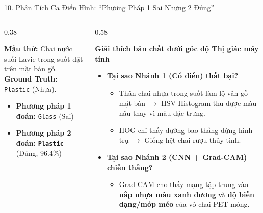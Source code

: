 \documentclass[aspectratio=169, 10pt]{beamer}
\begin{document}
\begin{frame}{10. Phân Tích Ca Điển Hình: ``Phương Pháp 1 Sai Nhưng 2 Đúng''}
\begin{columns}[T]
  \begin{column}{0.38\textwidth}
    \begin{tcolorbox}[colback=white, colframe=AccentRed, title=\textbf{Tình huống thực tế}]
      \textbf{Mẫu thử:} Chai nước suối Lavie trong suốt đặt trên mặt bàn gỗ.\\
      \textbf{Ground Truth:} \texttt{Plastic} (Nhựa).
    \end{tcolorbox}
    \vspace{0.2cm}
    \begin{itemize}
      \item \textbf{Phương pháp 1 đoán:} \alert{\texttt{Glass}} (Sai)
      \item \textbf{Phương pháp 2 đoán:} \textcolor{GreenRecycle}{\textbf{\texttt{Plastic}}} (Đúng, 96.4\%)
    \end{itemize}
  \end{column}

  \begin{column}{0.58\textwidth}
    \begin{block}{\textbf{Giải thích bản chất dưới góc độ Thị giác máy tính}}
      \begin{itemize}
        \item \textbf{Tại sao Nhánh 1 (Cổ điển) thất bại?}
        \begin{itemize}
          \item Thân chai nhựa trong suốt làm lộ vân gỗ mặt bàn $\rightarrow$ HSV Histogram thu được màu nâu thay vì màu đặc trưng.
          \item HOG chỉ thấy đường bao thẳng đứng hình trụ $\rightarrow$ Giống hệt chai rượu thủy tinh.
        \end{itemize}
        \item \textbf{Tại sao Nhánh 2 (CNN + Grad-CAM) chiến thắng?}
        \begin{itemize}
          \item Grad-CAM cho thấy mạng tập trung vào \textbf{nắp nhựa màu xanh dương} và \textbf{độ biến dạng/móp méo} của vỏ chai PET mỏng.
        \end{itemize}
      \end{itemize}
    \end{block}
  \end{column}
\end{columns}
\end{frame}
\end{document}
